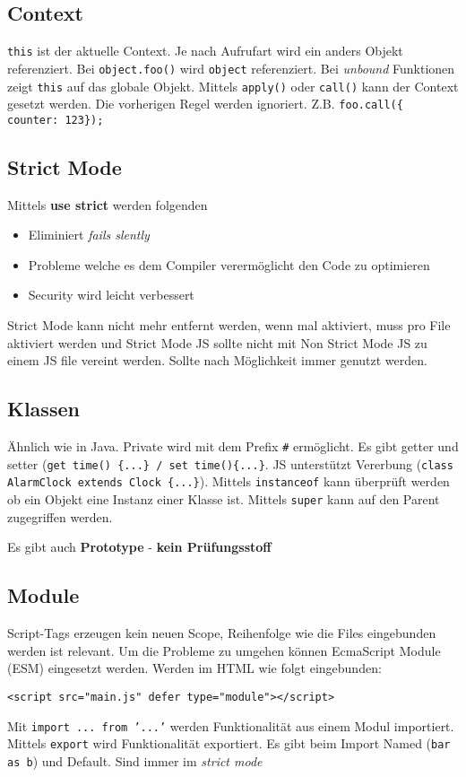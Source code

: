 \documentclass[11pt,twoside,landscape]{article}
\begin{document}
\begin{multicols}{4}
\subsection{Context}
\label{sec:org7f9a5f0}
\texttt{this} ist der aktuelle Context. Je nach Aufrufart wird ein anders Objekt referenziert. Bei \texttt{object.foo()} wird \texttt{object} referenziert. Bei \emph{unbound} Funktionen zeigt \texttt{this} auf das globale Objekt. Mittels \texttt{apply()} oder \texttt{call()} kann der Context gesetzt werden. Die vorherigen Regel werden ignoriert. Z.B. \texttt{foo.call(\{ counter: 123\});}

\subsection{Strict Mode}
\label{sec:orgd6030a5}
Mittels \textbf{use strict} werden folgenden 
\begin{itemize}
\item Eliminiert \emph{fails slently}
\item Probleme welche es dem Compiler verermöglicht den Code zu optimieren
\item Security wird leicht verbessert
\end{itemize}

Strict Mode kann nicht mehr entfernt werden, wenn mal aktiviert, muss pro File aktiviert werden und Strict Mode JS sollte nicht mit Non Strict Mode JS zu einem JS file vereint werden. Sollte nach Möglichkeit immer genutzt werden.

\subsection{Klassen}
\label{sec:orgcccf304}
Ähnlich wie in Java. Private wird mit dem Prefix \texttt{\#} ermöglicht. Es gibt getter und setter (\texttt{get time() \{...\} / set time()\{...\}}. JS unterstützt Vererbung (\texttt{class AlarmClock extends Clock \{...\}}). Mittels \texttt{instanceof} kann überprüft werden ob ein Objekt eine Instanz einer Klasse ist. Mittels \texttt{super} kann auf den Parent zugegriffen werden.

Es gibt auch \textbf{Prototype} - \textbf{kein Prüfungsstoff}

\subsection{Module}
\label{sec:org009fe7e}
Script-Tags erzeugen kein neuen Scope, Reihenfolge wie die Files eingebunden werden ist relevant. Um die Probleme zu umgehen können EcmaScript Module (ESM) eingesetzt werden. Werden im HTML wie folgt eingebunden:
\lstset{language=js,label= ,caption= ,captionpos=b,numbers=none}
\begin{lstlisting}
<script src="main.js" defer type="module"></script>
\end{lstlisting}
Mit \texttt{import ... from '...'} werden Funktionalität aus einem Modul importiert. Mittels \texttt{export} wird Funktionalität exportiert. Es gibt beim Import Named (\texttt{bar as b}) und Default. Sind immer im \emph{strict mode}


\end{multicols}
\end{document}
